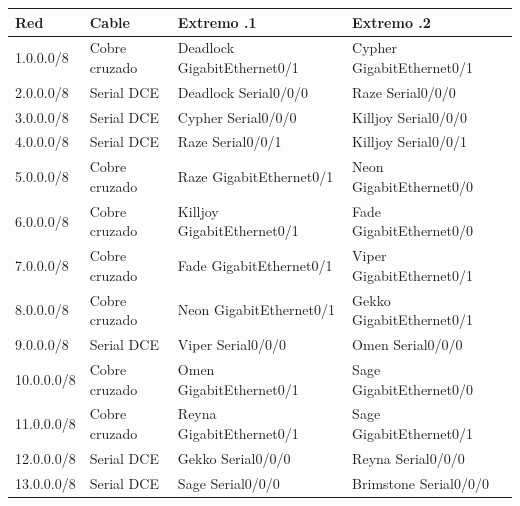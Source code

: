 \begin{tabular}{@{}llll@{}}
\toprule
Red & Cable & Extremo .1 & Extremo .2 \\
\midrule
1.0.0.0/8 & Cobre cruzado & Deadlock GigabitEthernet0/1 & Cypher GigabitEthernet0/1 \\
2.0.0.0/8 & Serial DCE & Deadlock Serial0/0/0 & Raze Serial0/0/0 \\
3.0.0.0/8 & Serial DCE & Cypher Serial0/0/0 & Killjoy Serial0/0/0 \\
4.0.0.0/8 & Serial DCE & Raze Serial0/0/1 & Killjoy Serial0/0/1 \\
5.0.0.0/8 & Cobre cruzado & Raze GigabitEthernet0/1 & Neon GigabitEthernet0/0 \\
6.0.0.0/8 & Cobre cruzado & Killjoy GigabitEthernet0/1 & Fade GigabitEthernet0/0 \\
7.0.0.0/8 & Cobre cruzado & Fade GigabitEthernet0/1 & Viper GigabitEthernet0/1 \\
8.0.0.0/8 & Cobre cruzado & Neon GigabitEthernet0/1 & Gekko GigabitEthernet0/1 \\
9.0.0.0/8 & Serial DCE & Viper Serial0/0/0 & Omen Serial0/0/0 \\
10.0.0.0/8 & Cobre cruzado & Omen GigabitEthernet0/1 & Sage GigabitEthernet0/0 \\
11.0.0.0/8 & Cobre cruzado & Reyna GigabitEthernet0/1 & Sage GigabitEthernet0/1 \\
12.0.0.0/8 & Serial DCE & Gekko Serial0/0/0 & Reyna Serial0/0/0 \\
13.0.0.0/8 & Serial DCE & Sage Serial0/0/0 & Brimstone Serial0/0/0 \\
\bottomrule
\end{tabular}
